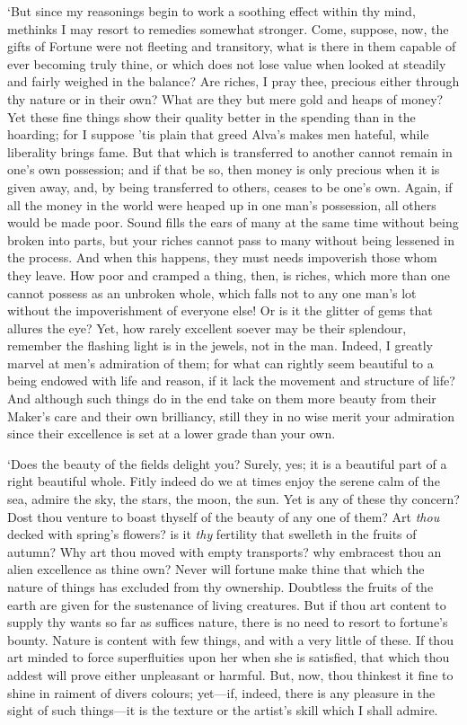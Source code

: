 \documentclass[12pt]{book}
\begin{document}
`But since my reasonings begin to work a soothing effect within thy
mind, methinks I may resort to remedies somewhat stronger. Come,
suppose, now, the gifts of Fortune were not fleeting and transitory,
what is there in them capable of ever becoming truly thine, or which
does not lose value when looked at steadily and fairly weighed in the
balance? Are riches, I pray thee, precious either through thy nature or
in their own? What are they but mere gold and heaps of money? Yet these
fine things show their quality better in the spending than in the
hoarding; for I suppose 'tis plain that greed Alva's makes men hateful,
while liberality brings fame. But that which is transferred to another
cannot remain in one's own possession; and if that be so, then money is
only precious when it is given away, and, by being transferred to
others, ceases to be one's own. Again, if all the money in the world
were heaped up in one man's possession, all others would be made poor.
Sound fills the ears of many at the same time without being broken into
parts, but your riches cannot pass to many without being lessened in the
process. And when this happens, they must needs impoverish those whom
they leave. How poor and cramped a thing, then, is riches, which more
than one cannot possess as an unbroken whole, which falls not to any one
man's lot without the impoverishment of everyone else! Or is it the
glitter of gems that allures the eye? Yet, how rarely excellent soever
may be their splendour, remember the flashing light is in the jewels,
not in the man. Indeed, I greatly marvel at men's admiration of them;
for what can rightly seem beautiful to a being endowed with life and
reason, if it lack the movement and structure of life? And although such
things do in the end take on them more beauty from their Maker's care
and their own brilliancy, still they in no wise merit your admiration
since their excellence is set at a lower grade than your own.

`Does the beauty of the fields delight you? Surely, yes; it is a
beautiful part of a right beautiful whole. Fitly indeed do we at times
enjoy the serene calm of the sea, admire the sky, the stars, the moon,
the sun. Yet is any of these thy concern? Dost thou venture to boast
thyself of the beauty of any one of them? Art \emph{thou} decked with
spring's flowers? is it \emph{thy} fertility that swelleth in the fruits of
autumn? Why art thou moved with empty transports? why embracest thou an
alien excellence as thine own? Never will fortune make thine that which
the nature of things has excluded from thy ownership. Doubtless the
fruits of the earth are given for the sustenance of living creatures.
But if thou art content to supply thy wants so far as suffices nature,
there is no need to resort to fortune's bounty. Nature is content with
few things, and with a very little of these. If thou art minded to force
superfluities upon her when she is satisfied, that which thou addest
will prove either unpleasant or harmful. But, now, thou thinkest it
fine to shine in raiment of divers colours; yet---if, indeed, there is
any pleasure in the sight of such things---it is the texture or the
artist's skill which I shall admire.
\end{document}
